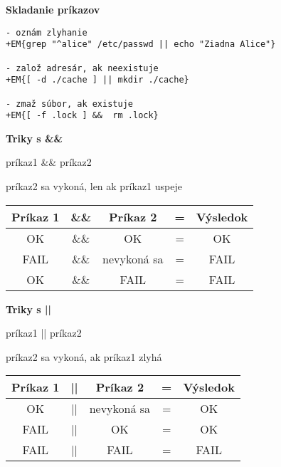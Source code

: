 \documentclass[8pt,landscape]{extarticle}
\newcommand{\Heading}[1]{%
{\begin{center}\bfseries\Large#1\end{center}}%
}%
\newenvironment{karticka}[1]%
{%
\Heading{#1}%
}%
{%
\clearpage
}%
\begin{document}
\begin{karticka}{Skladanie príkazov}
\begin{Verbatim}[commandchars=+\{\}]
- oznám zlyhanie
+EM{grep "^alice" /etc/passwd || echo "Ziadna Alice"}

- založ adresár, ak neexistuje
+EM{[ -d ./cache ] || mkdir ./cache}

- zmaž súbor, ak existuje
+EM{[ -f .lock ] &&  rm .lock}
\end{Verbatim}
\end{karticka}
\begin{karticka}{Triky s \&\&}
\begin{middlecolorbox}
príkaz1 \&\& príkaz2
\end{middlecolorbox}
\centering príkaz2 sa vykoná, len ak príkaz1 uspeje

\begin{table}[h!]\centering
\begin{tabular}{ccccc}
Príkaz 1 & \&\& & Príkaz 2 & = & Výsledok\\\hline
OK   & \&\& & OK & = & OK\\
FAIL & \&\& & nevykoná sa & = & FAIL\\
OK   & \&\& & FAIL & = & FAIL
\end{tabular}
\end{table}
\end{karticka}
\begin{karticka}{Triky s ||}
\begin{middlecolorbox}
príkaz1 || príkaz2
\end{middlecolorbox}
\centering príkaz2 sa vykoná, ak príkaz1 zlyhá

\begin{table}[h!]\centering
\begin{tabular}{ccccc}
Príkaz 1 & || & Príkaz 2 & = & Výsledok\\\hline
OK     & || & nevykoná sa & = & OK\\
FAIL   & || & OK & = & OK\\
FAIL   & || & FAIL & = & FAIL
\end{tabular}
\end{table}
\end{karticka}
\end{document}
